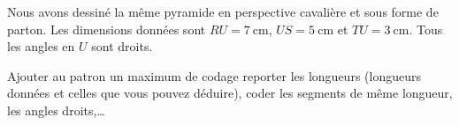 
\begin{exercice}\label{exo2smath-0248}



Nous avons dessiné la même pyramide en perspective cavalière et sous forme de parton. Les dimensions données sont $RU=\SI{7}{\centi\meter}$, \( US=\SI{5}{\centi\meter}\) et \( TU=\SI{3}{\centi\meter}\). Tous les angles en \( U\) sont droits.



\begin{center}
    \quad
\end{center}

Ajouter au patron un maximum de codage reporter les longueurs (longueurs données et celles que vous pouvez déduire), coder les segments de même longueur, les angles droits,\ldots

\end{exercice}
